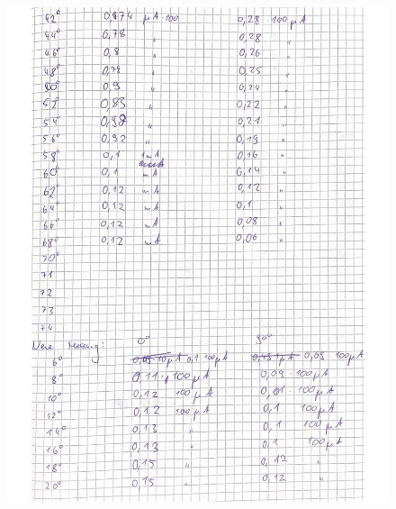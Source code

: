 \begin{figure}[H]
  \centering
  \includegraphics[width=\textwidth]{content/Bilder/2.Blatt.jpeg}
  \label{fig:Messungen_2}
\end{figure}
